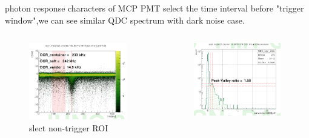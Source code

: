 \documentclass[11pt,compress,xcolor=x11names,UTF8]{beamer}
\begin{document}
\begin{frame}{photon response characters of MCP PMT }
select the time interval before "trigger window",we can see similar QDC spectrum with dark noise case.
\begin{columns}
\begin{column}{.495\textwidth}
\begin{figure}
\centering
\includegraphics[width=0.94\textwidth]{figure/roiwave.png} %
\caption{slect non-trigger ROI}
\end{figure}
\end{column}
\begin{column}{.475\textwidth}
\begin{figure}
\centering
\includegraphics[width=0.94\textwidth]{figure/roiqdc.png} %

\end{figure}
\end{column}
\end{columns}
\end{frame}
\end{document}

